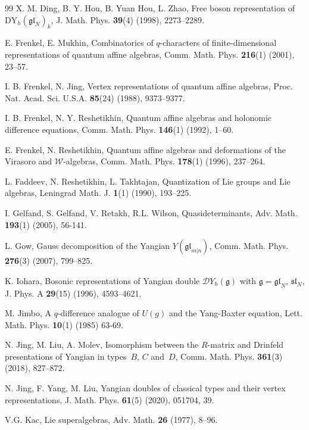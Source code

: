 \documentclass[a4paper,12pt]{article}
\numberwithin{equation}{section}
\begin{document}
\begin{thebibliography}{99}
 X. M. Ding, B. Y. Hou, B. Yuan Hou, L. Zhao, Free boson representation of $\mathrm{DY}_{h}(\mathfrak{gl}_{N})_{k}$, J. Math. Phys. \textbf{39}(4) (1998), 2273--2289.
 
E. Frenkel, E. Mukhin, Combinatorics of $q$-characters of finite-dimensional representations of quantum affine algebras, Comm. Math. Phys. \textbf{216}(1) (2001), 23--57.

I. B. Frenkel, N. Jing, Vertex representations of quantum affine algebras, Proc. Nat. Acad. Sci. U.S.A. \textbf{85}(24) (1988), 9373--9377.

I. B. Frenkel, N. Y. Reshetikhin, Quantum affine algebras and holonomic difference equations, Comm. Math. Phys. \textbf{146}(1) (1992), 1--60.

E. Frenkel, N. Reshetikhin, Quantum affine algebras and deformations of the Virasoro and $\mathcal{W}$-algebras, Comm. Math. Phys. \textbf{178}(1) (1996), 237--264.

L. Faddeev, N. Reshetikhin, L. Takhtajan, Quantization of Lie groups and Lie algebras, Leningrad Math. J. \textbf{1}(1) (1990), 193–225.

I. Gelfand, S. Gelfand, V. Retakh, R.L. Wilson, Quasideterminants, Adv. Math. \textbf{193}(1) (2005), 56-141.

L. Gow, Gauss decomposition of the Yangian {$Y({\mathfrak{gl}}_{m|n})$}, Comm. Math. Phys. \textbf{276}(3) (2007), 799--825.

K. Iohara, Bosonic representations of Yangian double $\mathcal{D}Y_{\hbar}(\mathfrak{g})$ with $\mathfrak{g}=\mathfrak{gl}_{N}$, $\mathfrak{sl}_{N}$, J. Phys. A \textbf{29}(15) (1996), 4593--4621.

M. Jimbo, A $q$-difference analogue of $U(g)$ and the Yang-Baxter equation, Lett. Math. Phys. \textbf{10}(1) (1985) 63-69.

N. Jing, M. Liu, A. Molev, Isomorphism between the $R$-matrix and Drinfeld presentations of Yangian in types~$B$, $C$ and~$D$, Comm. Math.
 Phys. \textbf{361}(3) (2018), 827--872.
 
N. Jing, F. Yang, M. Liu, Yangian doubles of classical types and their vertex representations, J. Math. Phys. \textbf{61}(5) (2020), 051704, 39.

V.G. Kac, Lie superalgebras, Adv. Math. \textbf{26} (1977), 8--96.


\end{thebibliography}
\end{document}
